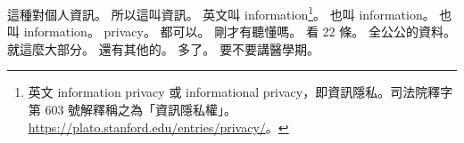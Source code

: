 \hypertarget{c01:cue:819}{}這種對個人資訊。
\hypertarget{c01:cue:820}{}所以這叫資訊。
\hypertarget{c01:cue:821}{}英文叫 information\footnote{英文 information privacy 或 informational privacy，即資訊隱私。司法院釋字第 603 號解釋稱之為「資訊隱私權」。\url{https://plato.stanford.edu/entries/privacy/}。}。
\hypertarget{c01:cue:822}{}也叫 information。
\hypertarget{c01:cue:823}{}也叫 information。
\hypertarget{c01:cue:824}{}privacy。
\hypertarget{c01:cue:825}{}都可以。
\hypertarget{c01:cue:826}{}剛才有聽懂嗎。
\hypertarget{c01:cue:827}{}看 22 條。
\hypertarget{c01:cue:828}{}全公公的資料。
\hypertarget{c01:cue:829}{}就這麼大部分。
\hypertarget{c01:cue:830}{}還有其他的。
\hypertarget{c01:cue:831}{}多了。
\hypertarget{c01:cue:832}{}要不要講醫學期。

